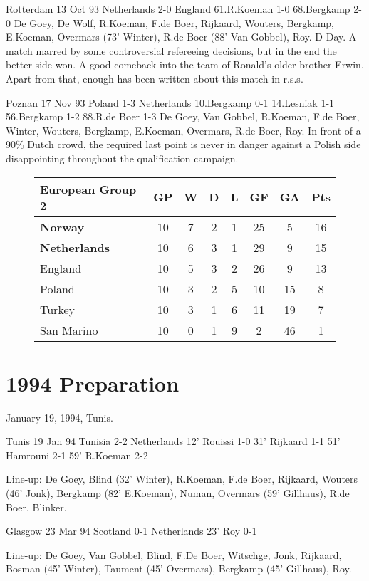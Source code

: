 Rotterdam    13 Oct 93        Netherlands 2-0 England
        61.R.Koeman 1-0 68.Bergkamp 2-0
      De Goey, De Wolf, R.Koeman, F.de Boer, Rijkaard, Wouters, Bergkamp,
      E.Koeman, Overmars (73' Winter), R.de Boer (88' Van Gobbel), Roy.
D-Day.  A match marred by some controversial refereeing decisions, but in the
 end the better side won.  A good comeback into the team of Ronald's older
 brother Erwin.  Apart from that, enough has been written about this match in 
 r.s.s.

Poznan       17 Nov 93        Poland      1-3 Netherlands
        10.Bergkamp 0-1 14.Lesniak 1-1 56.Bergkamp 1-2 88.R.de Boer 1-3
      De Goey, Van Gobbel, R.Koeman, F.de Boer, Winter, Wouters, Bergkamp,
      E.Koeman, Overmars, R.de Boer, Roy.  
In front of a 90\% Dutch crowd, the required last point is never in danger
 against a Polish side disappointing throughout the qualification campaign.
\begin{figure}[H]
\begin{tabular}{l c c c c c c c}
European Group 2 & GP & W & D & L & GF & GA & Pts \\ \hline
\textbf{Norway} & 10 & 7 & 2 & 1 & 25 & 5 & 16 \\
\textbf{Netherlands} & 10 & 6 & 3 & 1 & 29 & 9 & 15 \\
England & 10 & 5 & 3 & 2 & 26 & 9 & 13 \\
Poland & 10 & 3 & 2 & 5 & 10 & 15 & 8 \\
Turkey & 10 & 3 & 1 & 6 & 11 & 19 & 7 \\
San Marino & 10 & 0 & 1 & 9 & 2 & 46 & 1 \\ \hline
\end{tabular}
\end{figure}
\section{1994 Preparation}
January 19, 1994, Tunis.

Tunis        19 Jan 94        Tunisia     2-2 Netherlands
12' Rouissi 1-0  31' Rijkaard 1-1  51' Hamrouni 2-1  59' R.Koeman 2-2

Line-up:  De Goey, Blind (32' Winter), R.Koeman, F.de Boer, Rijkaard,
 Wouters (46' Jonk), Bergkamp (82' E.Koeman), Numan,
 Overmars (59' Gillhaus), R.de Boer, Blinker.

Glasgow      23 Mar 94        Scotland    0-1 Netherlands 
23' Roy 0-1

Line-up:  De Goey, Van Gobbel, Blind, F.De Boer, Witschge, Jonk, Rijkaard,
 Bosman (45' Winter), Taument (45' Overmars), Bergkamp (45' Gillhaus), 
 Roy.
  
